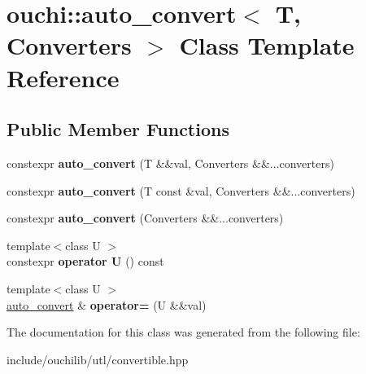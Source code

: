 \hypertarget{classouchi_1_1auto__convert}{}\section{ouchi\+::auto\+\_\+convert$<$ T, Converters $>$ Class Template Reference}
\label{classouchi_1_1auto__convert}
\subsection*{Public Member Functions}
\begin{DoxyCompactItemize}
\item 
\mbox{\label{classouchi_1_1auto__convert_a863909e1005fb43d0da1c11a55f7ca35}} 
constexpr {\bfseries auto\+\_\+convert} (T \&\&val, Converters \&\&...converters)
\item 
\mbox{\label{classouchi_1_1auto__convert_a0d9e31141905d749ca713532eb5d8234}} 
constexpr {\bfseries auto\+\_\+convert} (T const \&val, Converters \&\&...converters)
\item 
\mbox{\label{classouchi_1_1auto__convert_abc0110cfe39343f811420c2d06c157fb}} 
constexpr {\bfseries auto\+\_\+convert} (Converters \&\&...converters)
\item 
\mbox{\label{classouchi_1_1auto__convert_aeac480081974d1e12ae398adb6ac7678}} 
{\footnotesize template$<$class U $>$ }\\constexpr {\bfseries operator U} () const
\item 
\mbox{\label{classouchi_1_1auto__convert_a89d563839f876699bbe4e7fd0c718bd5}} 
{\footnotesize template$<$class U $>$ }\\\mbox{\hyperlink{classouchi_1_1auto__convert}{auto\+\_\+convert}} \& {\bfseries operator=} (U \&\&val)
\end{DoxyCompactItemize}


The documentation for this class was generated from the following file\+:\begin{DoxyCompactItemize}
\item 
include/ouchilib/utl/convertible.\+hpp\end{DoxyCompactItemize}

